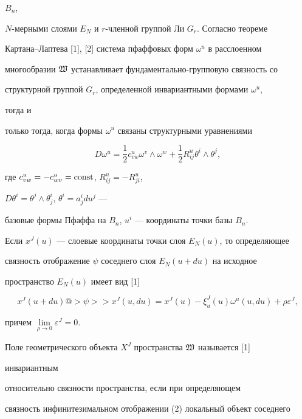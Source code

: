 $B_n$, 


$N$-мерными слоями $E_N$ и $r$-членной группой Ли $G_r$. Согласно теореме 


Картана--Лаптева [1], [2] система пфаффовых форм $\omega^u$ в расслоенном 


многообразии $\frak W$ устанавливает фундаментально-групповую связность со 


структурной группой $G_r$, определенной инвариантными формами $\omega^u$, 


тогда и 


только тогда, когда формы $\omega^u$ связаны структурными уравнениями 


\begin{equation} 


D\omega^u=\frac{1}{2}c^u_{vw}\omega^v\wedge\omega^w+ 


\frac{1}{2}R^u_{ij}\theta^i\wedge\theta^j, 


\end{equation} 


где $c^u_{vw}=-c^u_{wv}=\operatorname{const}$, $R^u_{ij}=-R^u_{ji}$, 


$D\theta^i=\theta^j\wedge\theta^i_j$, $\theta^i=a^i_j du^j$ --- 


базовые формы Пфаффа на $B_n$, $u^i$ --- координаты точки базы $B_n$. 


 


Если $x^J(u)$ --- слоевые координаты точки слоя $E_N(u)$, то определяющее 


связность отображение $\psi$ соседнего слоя $E_N(u+du)$ на исходное 


пространство $E_N(u)$ имеет вид [1] 


\begin{equation} 


x^J(u+du)@>{\psi}>> x^J(u,du)=x^J(u)- 


\xi^J_u(u)\omega^u(u,du)+\rho\varepsilon^J, 


\end{equation} 


причем $\lim\limits_{\rho\to0}\varepsilon^J=0$. 


 


Поле геометрического объекта $X^J$ пространства $\frak W$ называется [1] 


инвариантным 


относительно связности пространства, если при определяющем 


связность инфинитезимальном отображении (2) локальный объект соседнего 


